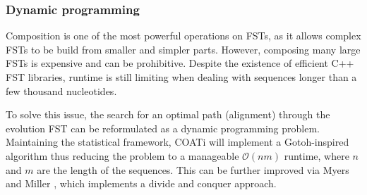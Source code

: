 \subsubsection{Dynamic programming}

Composition is one of the most powerful operations on FSTs, as it allows complex
FSTs to be build from smaller and simpler parts.
However, composing many large FSTs is expensive and can be prohibitive.
Despite the existence of efficient C++ FST libraries, runtime is still limiting
when dealing with sequences longer than a few thousand nucleotides.

To solve this issue, the search for an optimal path (alignment) through the
evolution FST can be reformulated as a dynamic programming problem.
Maintaining the statistical framework, COATi will implement a Gotoh-inspired
algorithm thus reducing the problem to a manageable $\mathcal{O}(nm)$
runtime, where $n$ and $m$ are the length of the sequences.
This can be further improved via Myers and Miller \parencite{myers_miller_1988},
which implements a divide and conquer approach.

